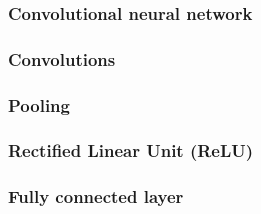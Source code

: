 
\subsubsection{Convolutional neural network}


\subsubsection{Convolutions}


\subsubsection{Pooling}


\subsubsection{Rectified Linear Unit (ReLU)}


\subsubsection{Fully connected layer}

